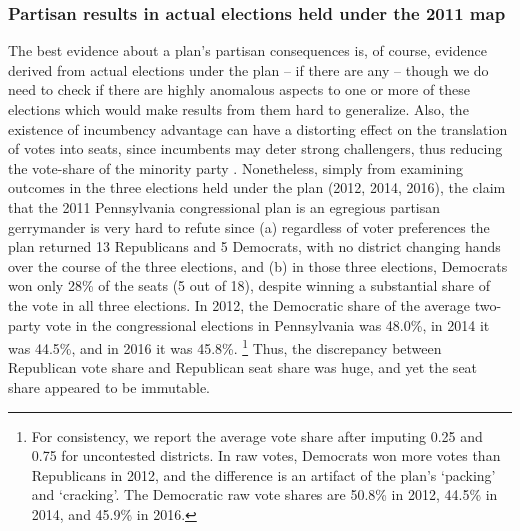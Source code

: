             \subsubsection*{Partisan results in actual elections held under the 2011 map}
    The best evidence about a plan’s partisan consequences is, of course, evidence derived from actual elections under the plan -- if there are any -- though we do need to check if there are highly anomalous aspects to one or more of these elections which would make results from them hard to generalize. Also, the existence of incumbency advantage can have a distorting effect on the translation of votes into seats, since incumbents may deter strong challengers, thus reducing the vote-share of the minority party \citep{Jacobson_Kernell_1981, Abramowitz1991}. Nonetheless, simply from examining outcomes in the three elections held under the plan (2012, 2014, 2016), the claim that the 2011 Pennsylvania congressional plan is an egregious partisan gerrymander is very hard to refute since (a) regardless of voter preferences the plan returned 13 Republicans and 5 Democrats, with no district changing hands over the course of the three elections, and (b) in those three elections, Democrats won only 28\% of the seats (5 out of 18), despite winning a substantial share of the vote in all three elections. In 2012, the Democratic share of the average two-party vote in the congressional elections in Pennsylvania was 48.0\%, in 2014 it was 44.5\%, and in 2016 it was 45.8\%. 
        \footnote{For consistency, we report the average vote share after imputing 0.25 and 0.75 for uncontested districts. In raw votes, Democrats won more votes than Republicans in 2012, and the difference is an artifact of the plan's `packing' and `cracking'. The Democratic raw vote shares are 50.8\% in 2012, 44.5\% in 2014, and 45.9\% in 2016.}
    Thus, the discrepancy between Republican vote share and Republican seat share was huge, and yet the seat share appeared to be immutable.
\par
%
